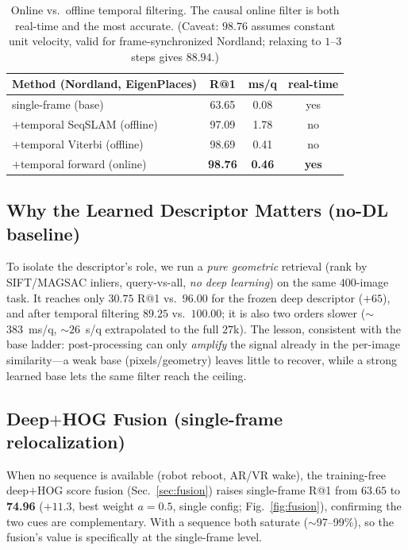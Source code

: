 \documentclass[10pt,twocolumn,letterpaper]{article}
\begin{document}
\begin{table}[t]
  \centering
  \small
  \begin{tabular}{lccc}
    \toprule
    Method (Nordland, EigenPlaces) & R@1 & ms/q & real-time \\
    \midrule
    single-frame (base)          & 63.65 & 0.08 & yes \\
    ${+}$temporal SeqSLAM (offline) & 97.09 & 1.78 & no \\
    ${+}$temporal Viterbi (offline) & 98.69 & 0.41 & no \\
    ${+}$temporal forward (online)  & \textbf{98.76} & \textbf{0.46} & \textbf{yes} \\
    \bottomrule
  \end{tabular}
  \caption{Online vs.\ offline temporal filtering. The causal online filter is
  both real-time and the most accurate. (Caveat: $98.76$ assumes constant unit
  velocity, valid for frame-synchronized Nordland; relaxing to $1$--$3$ steps
  gives $88.94$.)}
  \label{tab:rt}
\end{table}

\subsection{Why the Learned Descriptor Matters (no-DL baseline)}
\label{sec:nodl}
To isolate the descriptor's role, we run a \emph{pure geometric} retrieval (rank
by SIFT/MAGSAC inliers, query-vs-all, \emph{no deep learning}) on the same
$400$-image task. It reaches only $30.75$ R@1 vs.\ $96.00$ for the frozen deep
descriptor ($+65$), and after temporal filtering $89.25$ vs.\ $100.00$; it is
also two orders slower ($\sim$383~ms/q, ${\sim}26$~s/q extrapolated to the full
$27$k). The lesson, consistent with the base ladder: post-processing can only
\emph{amplify} the signal already in the per-image similarity---a weak base
(pixels/geometry) leaves little to recover, while a strong learned base lets the
same filter reach the ceiling.

\subsection{Deep${+}$HOG Fusion (single-frame relocalization)}
When no sequence is available (robot reboot, AR/VR wake), the training-free
deep${+}$HOG score fusion (Sec.~\ref{sec:fusion}) raises single-frame R@1 from
$63.65$ to \textbf{74.96} ($+11.3$, best weight $a{=}0.5$, single config;
Fig.~\ref{fig:fusion}), confirming the two cues are complementary. With a
sequence both saturate ($\sim$97--99\%), so the fusion's value is specifically
at the single-frame level.
\end{document}
